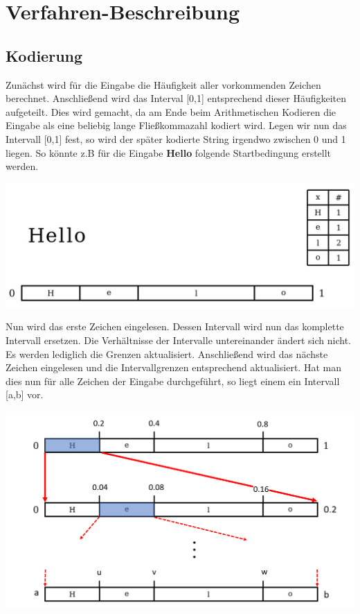 \documentclass[a4paper]{article}
\theoremstyle{definition}
\theoremstyle{remark}
\begin{document}
		\section{Verfahren-Beschreibung}
		\subsection{Kodierung}
		\label{sec:Verfahren-Kodierung}
Zunächst wird für die Eingabe die Häufigkeit aller vorkommenden Zeichen berechnet. Anschließend wird das Interval [0,1] entsprechend dieser Häufigkeiten aufgeteilt. Dies wird gemacht, da am Ende  beim Arithmetischen Kodieren die Eingabe als eine beliebig lange Fließkommazahl kodiert wird. Legen wir nun das Intervall [0,1] fest, so wird der später kodierte String irgendwo zwischen 0 und 1 liegen.
So könnte z.B für die Eingabe \textbf{Hello} folgende Startbedingung erstellt werden.
\begin{center}
\includegraphics[scale=0.4]{enc-schritt1}
\end{center}
Nun wird das erste Zeichen eingelesen. Dessen Intervall wird nun das komplette Intervall ersetzen. Die Verhältnisse der Intervalle untereinander ändert sich nicht. Es werden lediglich die Grenzen aktualisiert. Anschließend wird das nächste Zeichen eingelesen und die Intervallgrenzen entsprechend aktualisiert. Hat man dies nun für alle Zeichen der Eingabe durchgeführt, so liegt einem ein Intervall [a,b] vor.
\begin{center}
\includegraphics[scale=0.5]{enc-schritt2}
\end{center}
\end{document}
